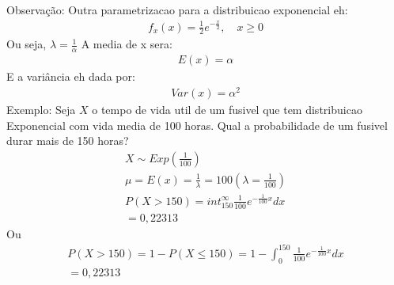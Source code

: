 \begin{description}
\begin{enumerate}
        Observação: Outra parametrizacao para a distribuicao exponencial eh:
        \begin{align*}
          f_{x} (x)= \frac{1}{2}e^{-\frac{x}{2}}, \quad x\ge 0
        \end{align*}
        Ou seja, $\lambda= \frac{1}{\alpha}$
        A media de x sera:
        \begin{align*}
          E(x)  = \alpha
        \end{align*}
        E a variância eh dada por:
        \begin{align*}
          Var(x) = \alpha^2
        \end{align*}
        Exemplo: Seja $X$ o tempo de vida util de um fusivel que tem distribuicao Exponencial
        com vida media de 100 horas. Qual a probabilidade de um fusivel durar mais de 150
        horas?
        \begin{align*}
          X \sim  Exp(\frac{1}{100}) \\
          \mu = E(x)= \frac{1}{\lambda}=100 \left( \lambda= \frac{1}{100} \right)\\
          P(X> 150)= int_{150}^{\infty} \frac{1}{100} e^{- \frac{1}{100} x} dx \\
          =0,22313
        \end{align*}
        Ou 
        \begin{align*}
          P(X>150) = 1- P(X \le 150)= 1- \int_{0}^{150} \frac{1}{100} e^{- \frac{1}{100}x}dx \\
          = 0,22313
        \end{align*}
      \end{enumerate}
\end{description}
